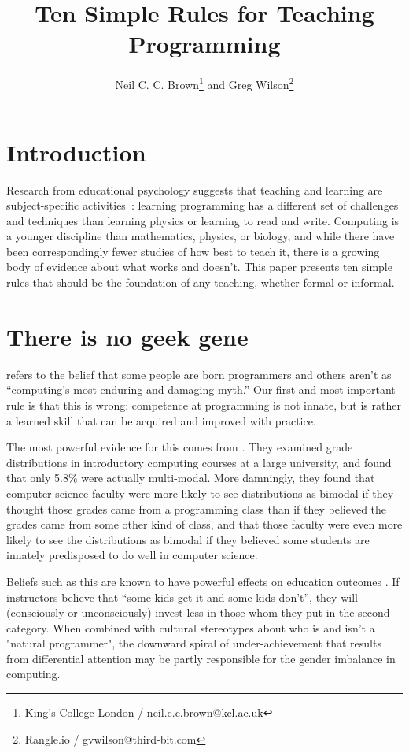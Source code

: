 \documentclass{article}
\title{Ten Simple Rules for Teaching Programming}
\author{Neil C. C. Brown\footnote{King's College London / neil.c.c.brown@kcl.ac.uk} and Greg Wilson\footnote{Rangle.io / gvwilson@third-bit.com}}
\begin{document}
\maketitle

\section*{Introduction}

Research from educational psychology suggests that teaching and learning are subject-specific
activities~\citep{mayer-subject}: learning programming has a different set of challenges and techniques
than learning physics or learning to read and write.  Computing is a younger discipline than
mathematics, physics, or biology, and while there have been correspondingly fewer studies of how best to teach it,
there is a growing body of evidence about what works and doesn't.
This paper presents ten simple rules that should be the foundation of any teaching, whether
formal or informal.


\section{There is no geek gene}\label{gene}

\citet{guzdial-myths} refers to the belief that some people are born programmers and others aren't
as ``computing's most enduring and damaging myth.''
Our first and most important rule is that this is wrong:
competence at programming is not innate,
but is rather a learned skill that can be acquired and improved with practice.

The most powerful evidence for this comes from \citet{patitsas-bimodal}.
They examined grade distributions in introductory computing courses at a large university,
and found that only 5.8\% were actually multi-modal.
More damningly,
they found that computer science faculty were more likely to see distributions as bimodal
if they thought those grades came from a programming class
than if they believed the grades came from some other kind of class,
and that those faculty were even more likely to see the distributions as bimodal
if they believed some students are innately predisposed to do well in computer science.

Beliefs such as this are known to have powerful effects on education outcomes
\cite{alvidrez-weinstein,brophy,jussim-eccles}.
If instructors believe that ``some kids get it and some kids don't'',
they will (consciously or unconsciously) invest less in those whom they put in the second category.
When combined with cultural stereotypes about who is and isn't a "natural programmer",
the downward spiral of under-achievement that results from differential attention
may be partly responsible for the gender imbalance in computing.
\end{document}
